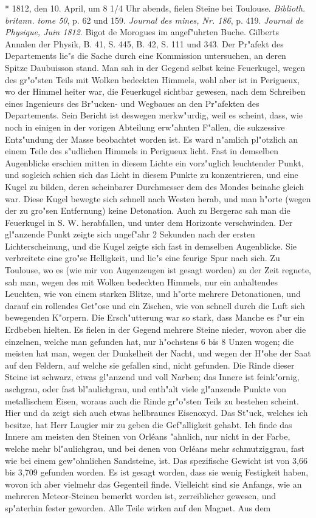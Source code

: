 \documentclass[a4paper, 11pt, oneside, polutonikogreek, german]{article}
\begin{document}
* 1812, den 10. April, um 8 1/4 Uhr abends, fielen Steine bei Toulouse. \emph{Biblioth. britann. tome 50}, p. 62 und 159. \emph{Journal des mines, Nr. 186}, p. 419. \emph{Journal de Physique, Juin 1812}. Bigot de Morogues im angef"uhrten Buche. Gilberts Annalen der Physik, B. 41, S. 445, B. 42, S. 111 und 343. Der Pr"afekt des Departements lie"s die Sache durch eine Kommission untersuchen, an deren Spitze Daubuisson stand. Man sah in der Gegend selbst keine Feuerkugel, wegen des gr"o"sten Teils mit Wolken bedeckten Himmels, wohl aber ist in Perigueux, wo der Himmel heiter war, die Feuerkugel sichtbar gewesen, nach dem Schreiben eines Ingenieurs des Br"ucken- und Wegbaues an den Pr"afekten des Departements. Sein Bericht ist deswegen merkw"urdig, weil es scheint, dass, wie noch in einigen in der vorigen Abteilung erw"ahnten F"allen, die sukzessive Entz"undung der Masse beobachtet worden ist. Es ward n"amlich pl"otzlich an einem Teile des s"udlichen Himmels in Perigueux licht. Fast in demselben Augenblicke erschien mitten in diesem Lichte ein vorz"uglich leuchtender Punkt, und sogleich schien sich das Licht in diesem Punkte zu konzentrieren, und eine Kugel zu bilden, deren scheinbarer Durchmesser dem des Mondes beinahe gleich war. Diese Kugel bewegte sich schnell nach Westen herab, und man h"orte (wegen der zu gro"sen Entfernung) keine Detonation. Auch zu Bergerac sah man die Feuerkugel in S. W. herabfallen, und unter dem Horizonte verschwinden. Der gl"anzende Punkt zeigte sich ungef"ahr 2 Sekunden nach der ersten Lichterscheinung, und die Kugel zeigte sich fast in demselben Augenblicke. Sie verbreitete eine gro"se Helligkeit, und lie"s eine feurige Spur nach sich. Zu Toulouse, wo es (wie mir von Augenzeugen ist gesagt worden) zu der Zeit regnete, sah man, wegen des mit Wolken bedeckten Himmels, nur ein anhaltendes Leuchten, wie von einem starken Blitze, und h"orte mehrere Detonationen, und darauf ein rollendes Get"ose und ein Zischen, wie von schnell durch die Luft sich bewegenden K"orpern. Die Ersch"utterung war so stark, dass Manche es f"ur ein Erdbeben hielten. Es fielen in der Gegend mehrere Steine nieder, wovon aber die einzelnen, welche man gefunden hat, nur h"ochstens 6 bis 8 Unzen wogen; die meisten hat man, wegen der Dunkelheit der Nacht, und wegen der H"ohe der Saat auf den Feldern, auf welche sie gefallen sind, nicht gefunden. Die Rinde dieser Steine ist schwarz, etwas gl"anzend und voll Narben; das Innere ist feink"ornig, aschgrau, oder fast bl"aulichgrau, und enth"alt viele gl"anzende Punkte von metallischem Eisen, woraus auch die Rinde gr"o"sten Teils zu bestehen scheint. Hier und da zeigt sich auch etwas hellbraunes Eisenoxyd. Das St"uck, welches ich besitze, hat Herr Laugier mir zu geben die Gef"alligkeit gehabt. Ich finde das Innere am meisten den Steinen von Orléans "ahnlich, nur nicht in der Farbe, welche mehr bl"aulichgrau, und bei denen von Orléans mehr schmutziggrau, fast wie bei einem gew"ohnlichen Sandsteine, ist. Das spezifische Gewicht ist von 3,66 bis 3,709 gefunden worden. Es ist gesagt worden, dass sie wenig Festigkeit haben, wovon ich aber vielmehr das Gegenteil finde. Vielleicht sind sie Anfangs, wie an mehreren Meteor-Steinen bemerkt worden ist, zerreiblicher gewesen, und sp"aterhin fester geworden. Alle Teile wirken auf den Magnet. Aus dem 
\end{document}

